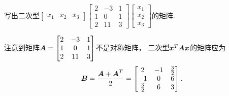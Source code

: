 \begin{example}
写出二次型\(\begin{bmatrix}
	x_1 & x_2 & x_3
\end{bmatrix}
\begin{bmatrix}
	2 & -3 & 1 \\
	1 & 0 & 1 \\
	2 & 11 & 3
\end{bmatrix}
\begin{bmatrix}
	x_1 \\ x_2 \\ x_3
\end{bmatrix}\)的矩阵.
\begin{solution}
注意到矩阵\(\boldsymbol{A} = \begin{bmatrix}
	2 & -3 & 1 \\
	1 & 0 & 1 \\
	2 & 11 & 3
\end{bmatrix}\)不是对称矩阵，
二次型\(\boldsymbol{x}^T\boldsymbol{A}\boldsymbol{x}\)的矩阵应为\[
	\boldsymbol{B}
	= \frac{\boldsymbol{A}+\boldsymbol{A}^T}{2}
	= \begin{bmatrix}
		2 & -1 & \frac{3}{2} \\
		-1 & 0 & 6 \\
		\frac{3}{2} & 6 & 3
	\end{bmatrix}.
\]
\end{solution}
\end{example}

